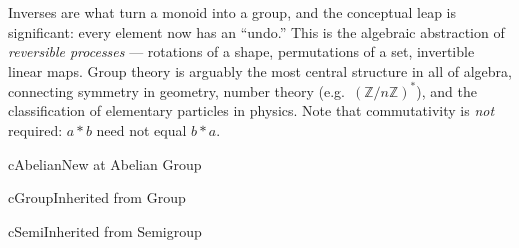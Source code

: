 \begin{remark}
  Inverses are what turn a monoid into a group, and the conceptual leap is
  significant: every element now has an ``undo.''  This is the algebraic
  abstraction of \emph{reversible processes} --- rotations of a shape,
  permutations of a set, invertible linear maps.  Group theory is arguably the
  most central structure in all of algebra, connecting symmetry in geometry,
  number theory (e.g.\ $(\mathbb{Z}/n\mathbb{Z})^*$), and the classification of
  elementary particles in physics.  Note that commutativity is \emph{not}
  required: $a * b$ need not equal $b * a$.
\end{remark}



\clearpage\thispagestyle{plain}

\begin{bpnew}{cAbelian}{New at Abelian Group}
\end{bpnew}

\begin{bpinh}{cGroup}{Inherited from Group}
\end{bpinh}

\begin{bpinh}{cSemi}{Inherited from Semigroup}
\end{bpinh}

